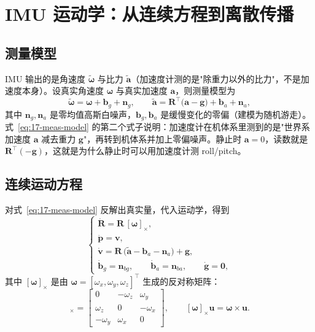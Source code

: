 \section{IMU 运动学：从连续方程到离散传播}\label{sec:17-imu}

\subsection{测量模型}

IMU 输出的是角速度 $\tilde{\bm{\omega}}$ 与比力 $\tilde{\bm{a}}$（加速度计测的是"除重力以外的比力"，不是加速度本身）。设真实角速度 $\bm{\omega}$ 与真实加速度 $\bm{a}$，则测量模型为
\begin{equation}\label{eq:17-meas-model}
  \tilde{\bm{\omega}}=\bm{\omega}+\bm{b}_g+\bm{n}_g,\qquad
  \tilde{\bm{a}}=\bm{R}^{\top}\bigl(\bm{a}-\bm{g}\bigr)+\bm{b}_a+\bm{n}_a,
\end{equation}
其中 $\bm{n}_g,\bm{n}_a$ 是零均值高斯白噪声，$\bm{b}_g,\bm{b}_a$ 是缓慢变化的零偏（建模为随机游走）。式~\eqref{eq:17-meas-model} 的第二个式子说明：加速度计在机体系里测到的是"世界系加速度 $\bm{a}$ 减去重力 $\bm{g}$"，再转到机体系并加上零偏噪声。静止时 $\bm{a}=0$，读数就是 $\bm{R}^{\top}(-\bm{g})$，这就是为什么静止时可以用加速度计测 roll/pitch。

\subsection{连续运动方程}

对式~\eqref{eq:17-meas-model} 反解出真实量，代入运动学，得到
\begin{equation}\label{eq:17-continuous}
  \begin{cases}
    \dot{\bm{R}}=\bm{R}\,[\bm{\omega}]_\times,\\
    \dot{\bm{p}}=\bm{v},\\
    \dot{\bm{v}}=\bm{R}\,\bigl(\tilde{\bm{a}}-\bm{b}_a-\bm{n}_a\bigr)+\bm{g},\\
    \dot{\bm{b}}_g=\bm{n}_{bg},\qquad \dot{\bm{b}}_a=\bm{n}_{ba},\qquad \dot{\bm{g}}=\bm{0},
  \end{cases}
\end{equation}
其中 $[\bm{\omega}]_\times$ 是由 $\bm{\omega}=[\omega_x,\omega_y,\omega_z]^{\top}$ 生成的反对称矩阵：
\begin{equation}
  [\bm{\omega}]_\times=\begin{bmatrix}0&-\omega_z&\omega_y\\ \omega_z&0&-\omega_x\\ -\omega_y&\omega_x&0\end{bmatrix},\qquad
  [\bm{\omega}]_\times\bm{u}=\bm{\omega}\times\bm{u}.
\end{equation}

